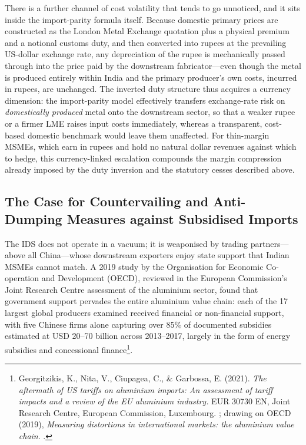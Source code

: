 \documentclass[11pt, a4paper]{article}
\numberwithin{figure}{section}
\numberwithin{table}{section}
\begin{document}
There is a further channel of cost volatility that tends to go unnoticed, and it sits inside the import-parity formula itself. Because domestic primary prices are constructed as the London Metal Exchange quotation plus a physical premium and a notional customs duty, and then converted into rupees at the prevailing US-dollar exchange rate, any depreciation of the rupee is mechanically passed through into the price paid by the downstream fabricator---even though the metal is produced entirely within India and the primary producer's own costs, incurred in rupees, are unchanged. The inverted duty structure thus acquires a currency dimension: the import-parity model effectively transfers exchange-rate risk on \emph{domestically produced} metal onto the downstream sector, so that a weaker rupee or a firmer LME raises input costs immediately, whereas a transparent, cost-based domestic benchmark would leave them unaffected. For thin-margin MSMEs, which earn in rupees and hold no natural dollar revenues against which to hedge, this currency-linked escalation compounds the margin compression already imposed by the duty inversion and the statutory cesses described above.

\subsection{The Case for Countervailing and Anti-Dumping Measures against Subsidised Imports}
The IDS does not operate in a vacuum; it is weaponised by trading partners—above all China—whose downstream exporters enjoy state support that Indian MSMEs cannot match. A 2019 study by the Organisation for Economic Co-operation and Development (OECD), reviewed in the European Commission's Joint Research Centre assessment of the aluminium sector, found that government support pervades the entire aluminium value chain: each of the 17 largest global producers examined received financial or non-financial support, with five Chinese firms alone capturing over 85\% of documented subsidies estimated at USD 20--70 billion across 2013--2017, largely in the form of energy subsidies and concessional finance\footnote{Georgitzikis, K., Nita, V., Ciupagea, C., \& Garbossa, E. (2021). \textit{The aftermath of US tariffs on aluminium imports: An assessment of tariff impacts and a review of the EU aluminium industry.} EUR 30730 EN, Joint Research Centre, European Commission, Luxembourg. \cite{jrc2021}; drawing on OECD (2019), \textit{Measuring distortions in international markets: the aluminium value chain}. \cite{oecd2019}.}.
\end{document}
